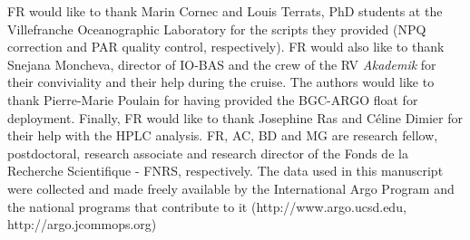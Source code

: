 \documentclass[journal abbreviation, manuscript]{copernicus}
\begin{document}






\begin{acknowledgements}
FR would like to thank Marin Cornec and Louis Terrats, PhD students at the Villefranche Oceanographic Laboratory for the scripts they provided (NPQ correction and PAR quality control, respectively). FR would also like to thank Snejana Moncheva, director of IO-BAS and the crew of the RV \textit{Akademik} for their conviviality and their help during the cruise. The authors would like to thank Pierre-Marie Poulain for having provided the BGC-ARGO float for deployment. Finally, FR would like to thank Josephine Ras and Céline Dimier for their help with the HPLC analysis. FR, AC, BD and MG are research fellow, postdoctoral, research associate and research director of the Fonds de la Recherche Scientifique - FNRS, respectively.
The data used in this manuscript were collected and made freely available by the International Argo Program and the national programs that contribute to it (http://www.argo.ucsd.edu, http://argo.jcommops.org)
\end{acknowledgements}




\end{document}
